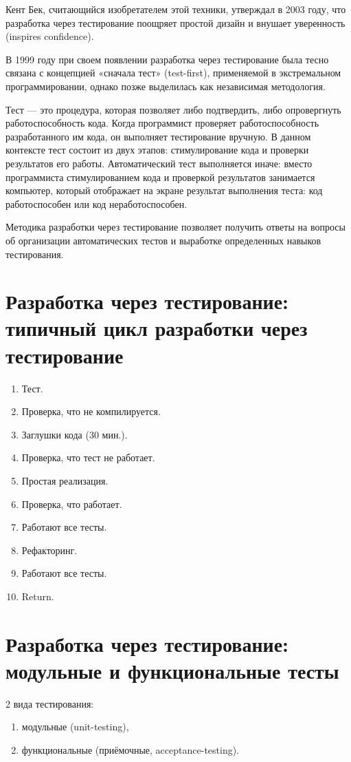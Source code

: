 \documentclass{article}
\let\stdsection\section
\renewcommand\section{\newpage\stdsection}
\begin{document}
    Кент Бек, считающийся изобретателем этой техники, утверждал в 2003 году, что разработка через тестирование поощряет простой дизайн и внушает уверенность (inspires confidence).

    В 1999 году при своем появлении разработка через тестирование была тесно связана с концепцией «сначала тест» (test-first), применяемой в экстремальном программировании, однако позже выделилась как независимая методология.

    Тест — это процедура, которая позволяет либо подтвердить, либо опровергнуть работоспособность кода. Когда программист проверяет работоспособность разработанного им кода, он выполняет тестирование вручную. В данном контексте тест состоит из двух этапов: стимулирование кода и проверки результатов его работы. Автоматический тест выполняется иначе: вместо программиста стимулированием кода и проверкой результатов занимается компьютер, который отображает на экране результат выполнения теста: код работоспособен или код неработоспособен.%

    Методика разработки через тестирование позволяет получить ответы на вопросы об организации автоматических тестов и выработке определенных навыков тестирования.

\section{Разработка через тестирование: типичный цикл разработки через тестирование}
    \begin{enumerate}
        \item Тест.
        \item Проверка, что не компилируется.
        \item Заглушки кода (30 мин.).
        \item Проверка, что тест не работает.
        \item Простая реализация.
        \item Проверка, что работает.
        \item Работают все тесты.
        \item Рефакторинг.
        \item Работают все тесты.
        \item Return.
    \end{enumerate}

\section{Разработка через тестирование: модульные и функциональные тесты}
    2 вида тестирования:
    \begin{enumerate}
        \item модульные (unit-testing),
        \item функциональные (приёмочные, acceptance-testing).
    \end{enumerate}
\end{document}
